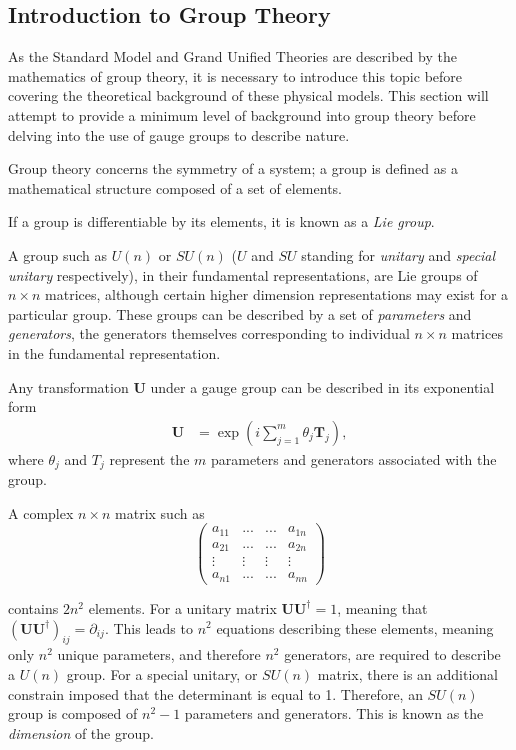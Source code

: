 \documentclass{article}
\begin{document}
\subsection{Introduction to Group Theory} %
\label{sec:intro}
As the Standard Model and Grand Unified Theories are described by the mathematics of group theory, it is necessary to introduce this topic before covering the theoretical background of these physical models. This section will attempt to provide a minimum level of background into group theory before delving into the use of gauge groups to describe nature.

Group theory concerns the symmetry of a system; a group is defined as a mathematical structure composed of a set of elements.

If a group is differentiable by its elements, it is known as a \textit{Lie group}. 

A group such as $U(n)$ or $SU(n)$ ($U$ and $SU$ standing for \textit{unitary} and \textit{special unitary} respectively), in their fundamental representations, are Lie groups of $n\times n$ matrices, although certain higher dimension representations may exist for a particular group. These groups can be described by a set of \textit{parameters} and \textit{generators}, the generators themselves corresponding to individual $n\times n$ matrices in the fundamental representation.

Any transformation $\bm{U}$ under a gauge group can be described in its exponential form
\begin{equation}
\label{eqn:expForm}
\begin{split}
\bm{U} &= \exp(i\sum\limits_{j=1}^{m}\theta_j \bm{T}_j),
\end{split}
\end{equation}
where $\theta_j$ and $T_j$ represent the $m$ parameters and generators associated with the group.

A complex $n\times n$ matrix such as
\begin{equation}
\label{matrix:unitary}
\left(
\begin{matrix}
    a_{11} & ... & ... & a_{1n} \\
    a_{21} & ... & ... & a_{2n} \\
    \vdots & \vdots & \vdots & \vdots \\
    a_{n1} & ... & ... & a_{nn}
\end{matrix}
\right)
\end{equation}

contains $2n^2$ elements. For a unitary matrix $\bm{U}\bm{U}^{\dagger}=1$, meaning that $(\bm{U}\bm{U}^{\dagger})_{ij}=\partial_{ij}$. This leads to $n^2$ equations describing these elements, meaning only $n^2$ unique parameters, and therefore $n^2$ generators, are required to describe a $U(n)$ group. For a special unitary, or $SU(n)$ matrix, there is an additional constrain imposed that the determinant is equal to 1. Therefore, an $SU(n)$ group is composed of $n^2 - 1$ parameters and generators. This is known as the \textit{dimension} of the group.
\end{document}
